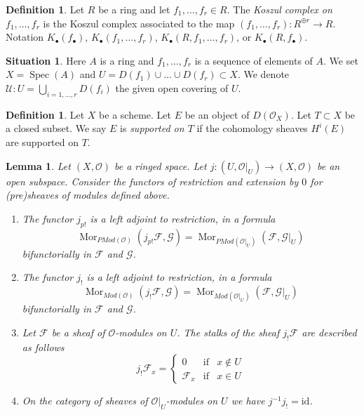\documentclass{amsart}
\theoremstyle{plain}
\newtheorem{lemma}[subsection]{Lemma}
\theoremstyle{definition}
\newtheorem{definition}[subsection]{Definition}
\newtheorem{situation}[subsection]{Situation}
\theoremstyle{remark}
\numberwithin{equation}{subsection}
\def\Spec{\mathop{\mathrm{Spec}}}
\def\Mor{\mathop{\mathrm{Mor}}\nolimits}
\begin{document}
\begin{definition}
\label{more-algebra-definition-koszul-complex}
Let $R$ be a ring and let $f_1, \ldots, f_r \in R$. The
{\it Koszul complex on $f_1, \ldots, f_r$} is the Koszul complex
associated to the map $(f_1, \ldots, f_r) : R^{\oplus r} \to R$.
Notation $K_\bullet(f_\bullet)$, $K_\bullet(f_1, \ldots, f_r)$,
$K_\bullet(R, f_1, \ldots, f_r)$, or $K_\bullet(R, f_\bullet)$.
\end{definition}

\begin{situation}
\label{situation-complex}
Here $A$ is a ring and $f_1, \ldots, f_r$ is a sequence of elements of $A$.
We set $X = \Spec(A)$ and $U = D(f_1) \cup \ldots \cup D(f_r) \subset X$.
We denote $\mathcal{U} : U = \bigcup_{i = 1, \ldots, r} D(f_i)$ the
given open covering of $U$.
\end{situation}

\begin{definition}
\label{definition-supported-on}
Let $X$ be a scheme. Let $E$ be an object of $D(\mathcal{O}_X)$.
Let $T \subset X$ be a closed subset.
We say $E$ is {\it supported on $T$} if the
cohomology sheaves $H^i(E)$ are supported on $T$.
\end{definition}

\begin{lemma}
\label{sheaves-lemma-j-shriek-modules}
Let $(X, \mathcal{O})$ be a ringed space.
Let $j : (U, \mathcal{O}|_U) \to (X, \mathcal{O})$
be an open subspace.
Consider the functors of restriction and extension
by $0$ for (pre)sheaves of modules defined above.
\begin{enumerate}
\item The functor $j_{p!}$ is a left adjoint to restriction,
in a formula
$$
\Mor_{\textit{PMod}(\mathcal{O})}(j_{p!}\mathcal{F}, \mathcal{G})
=
\Mor_{\textit{PMod}(\mathcal{O}|_U)}(\mathcal{F}, \mathcal{G}|_U)
$$
bifunctorially in $\mathcal{F}$ and $\mathcal{G}$.
\item The functor $j_!$ is a left adjoint to restriction,
in a formula
$$
\Mor_{\textit{Mod}(\mathcal{O})}(j_!\mathcal{F}, \mathcal{G})
=
\Mor_{\textit{Mod}(\mathcal{O}|_U)}(\mathcal{F}, \mathcal{G}|_U)
$$
bifunctorially in $\mathcal{F}$ and $\mathcal{G}$.
\item Let $\mathcal{F}$ be a sheaf of $\mathcal{O}$-modules on $U$.
The stalks of the sheaf $j_!\mathcal{F}$ are described
as follows
$$
j_{!}\mathcal{F}_x =
\left\{
\begin{matrix}
0 & \text{if} & x \not \in U \\
\mathcal{F}_x & \text{if} & x \in U
\end{matrix}
\right.
$$
\item On the category of sheaves of $\mathcal{O}|_U$-modules on $U$
we have $j^{-1}j_! = \text{id}$.
\end{enumerate}
\end{lemma}
\end{document}
